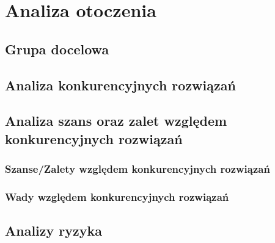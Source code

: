 \chapter{Analiza otoczenia}

\section{Grupa docelowa}
\section{Analiza konkurencyjnych rozwiązań}

\section{Analiza szans oraz zalet względem konkurencyjnych rozwiązań}
\subsection{Szanse/Zalety względem konkurencyjnych rozwiązań}
\subsection{Wady względem konkurencyjnych rozwiązań}

\section{Analizy ryzyka}

